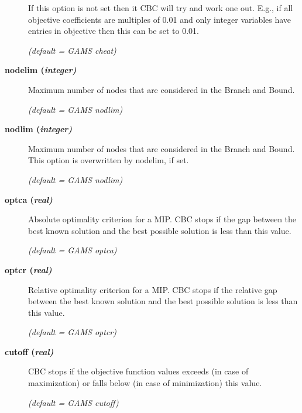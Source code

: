 \begin{description}
If this option is not set then it CBC will try and work one out.
E.g., if all objective coefficients are multiples of 0.01 and only integer variables have entries in objective then this can be set to 0.01.

\textsl{(default = GAMS cheat)}

\item[\label{nodelim}\hypertarget{nodelim}
{\textbf{nodelim (\slshape{integer})}}]\hspace{1.0in}

Maximum number of nodes that are considered in the Branch and Bound.

\textsl{(default = GAMS nodlim)}

\item[\label{nodlim}\hypertarget{nodlim}
{\textbf{nodlim (\slshape{integer})}}]\hspace{1.0in}

Maximum number of nodes that are considered in the Branch and Bound.
This option is overwritten by nodelim, if set.

\textsl{(default = GAMS nodlim)}

\item[\label{optca}\hypertarget{optca}
{\textbf{optca (\slshape{real})}}]\hspace{1.0in}

Absolute optimality criterion for a MIP.
CBC stops if the gap between the best known solution and the best possible solution is less than this value.

\textsl{(default = GAMS optca)}

\item[\label{optcr}\hypertarget{optcr}
{\textbf{optcr (\slshape{real})}}]\hspace{1.0in}

Relative optimality criterion for a MIP.
CBC stops if the relative gap between the best known solution and the best possible solution is less than this value.

\textsl{(default = GAMS optcr)}

\item[\label{cutoff}\hypertarget{cutoff}
{\textbf{cutoff (\slshape{real})}}]\hspace{1.0in}

CBC stops if the objective function values exceeds (in case of maximization) or falls below (in case of minimization) this value.

\textsl{(default = GAMS cutoff)}

\end{description}

